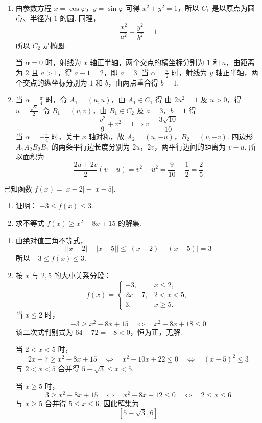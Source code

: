 \begin{solution}
\begin{enumerate}
\item 由参数方程 \(x=\cos\varphi\)，\(y=\sin\varphi\) 可得 \(x^{2}+y^{2}=1\)，所以 \(C_{1}\) 是以原点为圆心、半径为 \(1\) 的圆. 同理，
\[
\frac{x^{2}}{a^{2}}+\frac{y^{2}}{b^{2}}=1
\]
所以 \(C_{2}\) 是椭圆.

当 \(\alpha=0\) 时，射线为 \(x\) 轴正半轴，两个交点的横坐标分别为 \(1\) 和 \(a\)，由距离为 \(2\) 且 \(a>1\)，得 \(a-1=2\)，即 \(a=3\). 当 \(\alpha=\frac{\pi}{2}\) 时，射线为 \(y\) 轴正半轴，两个交点的纵坐标分别为 \(1\) 和 \(b\)，由两点重合得 \(b=1\).
\item 当 \(\alpha=\frac{\pi}{4}\) 时，令 \(A_{1}=(u,u)\)，由 \(A_{1}\in C_{1}\) 得
由 \(2u^{2}=1\) 及 \(u>0\)，得 \(u=\frac{\sqrt2}{2}\).
令 \(B_{1}=(v,v)\)，由 \(B_{1}\in C_{2}\) 及 \(a=3\)，\(b=1\) 得
\[
\frac{v^{2}}9+v^{2}=1\Longrightarrow v=\frac{3\sqrt{10}}{10}
\]
当 \(\alpha=-\frac{\pi}{4}\) 时，关于 \(x\) 轴对称，故 \(A_{2}=(u,-u)\)，\(B_{2}=(v,-v)\).
四边形 \(A_{1}A_{2}B_{2}B_{1}\) 的两条平行边长度分别为 \(2u\)，\(2v\)，两平行边间的距离为 \(v-u\). 所以面积为
\[
\frac{2u+2v}{2}(v-u)=v^{2}-u^{2}
=\frac9{10}-\frac12=\frac25
\]
\end{enumerate}
\end{solution}

\begin{problem}
已知函数 \(f(x) = |x - 2| - |x - 5|\).
\begin{enumerate}
\item 证明： \(-3 \leqslant f(x) \leqslant 3\).
\item 求不等式 \( f(x) \geqslant x^{2} - 8x + 15 \) 的解集.
\end{enumerate}
\end{problem}

\begin{solution}
\begin{enumerate}
\item 由绝对值三角不等式，
\[
\bigl||x-2|-|x-5|\bigr|
\leqslant |(x-2)-(x-5)|=3
\]
所以 \(-3\leqslant f(x)\leqslant3\).
\item 按 \(x\) 与 \(2,5\) 的大小关系分段：
\[
f(x)=
\begin{cases}
-3,&x\leqslant2,\\
2x-7,&2<x<5,\\
3,&x\geqslant5.
\end{cases}
\]
当 \(x\leqslant2\) 时，
\[
-3\geqslant x^2-8x+15
\quad\Longleftrightarrow\quad
x^2-8x+18\leqslant0
\]
该二次式判别式为 \(64-72=-8<0\)，恒为正，无解.

当 \(2<x<5\) 时，
\[
2x-7\geqslant x^2-8x+15
\quad\Longleftrightarrow\quad
x^2-10x+22\leqslant0
\quad\Longleftrightarrow\quad
(x-5)^2\leqslant3
\]
与 \(2<x<5\) 合并得 \(5-\sqrt3\leqslant x<5\).

当 \(x\geqslant5\) 时，
\[
3\geqslant x^2-8x+15
\quad\Longleftrightarrow\quad
x^2-8x+12\leqslant0
\quad\Longleftrightarrow\quad
2\leqslant x\leqslant6
\]
与 \(x\geqslant5\) 合并得 \(5\leqslant x\leqslant6\). 因此解集为
\[
[5-\sqrt3,6]
\]
\end{enumerate}
\end{solution}
